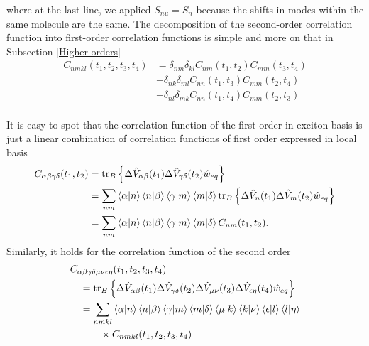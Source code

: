 where at the last line, we applied $S_{nu}=S_n$ because the shifts in modes within the same molecule are the same. The decomposition of the second-order correlation function into first-order correlation functions is simple and more on that in Subsection \ref{Higher orders}
\begin{equation}
\label{corr_fun_2nd_decomposition_local}
    \begin{aligned}
        C_{nmkl}(t_1, t_2, t_3, t_4) &= \delta_{nm}\delta_{kl}C_{nm}(t_1, t_2)C_{mm}(t_3, t_4) \\
        & + \delta_{nk}\delta_{ml} C_{nn}(t_1, t_3)C_{mm}(t_2, t_4) \\
        & + \delta_{nl}\delta_{mk} C_{nn}(t_1, t_4)C_{mm}(t_2, t_3) \\
    \end{aligned}
\end{equation}

It is easy to spot that the correlation function of the first order in exciton basis is just a linear combination of correlation functions of first order expressed in local basis
\begin{equation}
\label{corr_fun_1st_linear_comb}
    \begin{aligned}
    C_{\alpha\beta\gamma\delta}(t_1, t_2) &= \operatorname{tr}_B \left\{ \Delta \hat{V}_{\alpha\beta}(t_1) \Delta \hat{V}_{\gamma\delta}(t_2) \hat{w}_{eq}\right\} \\
    &= \sum_{nm}\braket{\alpha}{n}\braket{n}{\beta}\braket{\gamma}{m}\braket{m}{\delta}\operatorname{tr}_B \left\{ \Delta \hat{V}_{n}(t_1) \Delta \hat{V}_{m}(t_2) \hat{w}_{eq}\right\} \\
    &= \sum_{nm}\braket{\alpha}{n}\braket{n}{\beta}\braket{\gamma}{m}\braket{m}{\delta}C_{nm}(t_1, t_2).
    \end{aligned}
\end{equation}
Similarly, it holds for the correlation function of the second order
\begin{equation}
\label{corr_fun_2nd_linear_comb}
    \begin{aligned}
    &C_{\alpha \beta \gamma \delta \mu \nu \epsilon \eta}(t_1, t_2, t_3, t_4) \\
    &\quad= \operatorname{tr}_B \left\{\Delta \hat{V}_{\alpha\beta}(t_1) \Delta \hat{V}_{\gamma\delta}(t_2) \Delta \hat{V}_{\mu\nu}(t_3) \Delta \hat{V}_{\epsilon\eta}(t_4) \hat{w}_{eq}\right\} \\
    &\quad= \sum_{nmkl}\braket{\alpha}{n}\braket{n}{\beta}\braket{\gamma}{m}\braket{m}{\delta} \braket{\mu}{k}\braket{k}{\nu}\braket{\epsilon}{l}\braket{l}{\eta}\\
    &\quad \quad \quad \times C_{nmkl}(t_1, t_2, t_3, t_4) 
    \end{aligned}
\end{equation}


